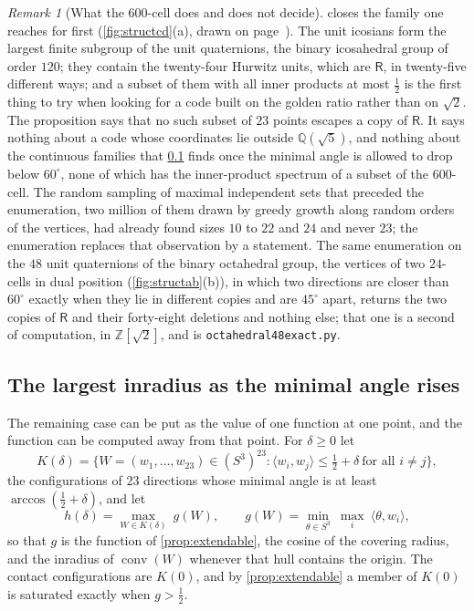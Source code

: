 \documentclass[11pt,reqno]{amsart}
\renewcommand{\_}{\origunderscore\allowbreak}
\numberwithin{equation}{section}
\theoremstyle{plain}
\theoremstyle{definition}
\theoremstyle{remark}
\newtheorem{remark}[thm]{Remark}
\newcommand{\Rt}{\mathsf{R}}                 %
\DeclareMathOperator{\conv}{conv}
\begin{document}
\begin{remark}[What the $600$-cell does and does not decide]\label{rem:cell600-scope}
 closes the family one reaches for first
(\cref{fig:structcd}(a), drawn on page~\pageref{fig:structcd}). The unit
icosians form the largest finite subgroup of the unit quaternions, the
binary icosahedral group of order $120$; they contain the twenty-four
Hurwitz units, which are $\Rt$, in twenty-five different ways; and a
subset of them with all inner products at most $\tfrac12$ is the first
thing to try when looking for a code built on the golden ratio rather
than on $\sqrt2$. The proposition says that no such subset of $23$
points escapes a copy of $\Rt$. It says nothing about a code whose coordinates lie outside
$\mathbb{Q}(\sqrt5)$, and nothing about the continuous families that
\cref{sec:slack-continuation} finds once the minimal angle is allowed to
drop below $60^\circ$, none of which has the inner-product spectrum of a
subset of the $600$-cell. The random sampling of maximal independent
sets that preceded the enumeration, two million of them drawn by greedy
growth along random orders of the vertices, had already found sizes
$10$ to $22$ and $24$ and never $23$; the enumeration replaces that
observation by a statement. The same enumeration on the $48$ unit
quaternions of the binary octahedral group, the vertices of two
$24$-cells in dual position (\cref{fig:structab}(b)), in
which two directions are closer than $60^\circ$ exactly when they lie
in different copies and are $45^\circ$ apart, returns the two copies of
$\Rt$ and their forty-eight deletions
and nothing else; that one is a second of computation, in
$\mathbb{Z}[\sqrt2]$, and is \texttt{octahedral48\_exact.py}.
\end{remark}

\subsection{The largest inradius as the minimal angle rises}\label{sec:slack-continuation}

The remaining case can be put as the value of one function at one
point, and the function can be computed away from that point. For
$\delta\ge0$ let
\[
  K(\delta)=\bigl\{W=(w_1,\dots,w_{23})\in(S^3)^{23} :
  \langle w_i,w_j\rangle\le\tfrac12+\delta\ \text{for all } i\ne j\bigr\},
\]
the configurations of $23$ directions whose minimal angle is at least
$\arccos(\tfrac12+\delta)$, and let
\[
  h(\delta)=\max_{W\in K(\delta)}\ g(W),
  \qquad
  g(W)=\min_{\theta\in S^3}\ \max_i\ \langle\theta,w_i\rangle ,
\]
so that $g$ is the function of \cref{prop:extendable}, the cosine of the
covering radius, and the inradius of $\conv(W)$ whenever that hull
contains the origin. The contact configurations are $K(0)$, and by
\cref{prop:extendable} a member of $K(0)$ is saturated exactly when
$g>\tfrac12$.
\end{document}
